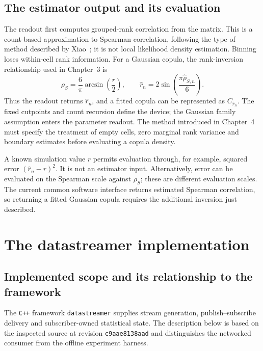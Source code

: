 \subsection{The estimator output and its evaluation}
The readout first computes grouped-rank correlation from the matrix. This is a count-based approximation to Spearman correlation, following the type of method described by Xiao~\cite{xiao_online_2017}; it is not local likelihood density estimation. Binning loses within-cell rank information. For a Gaussian copula, the rank-inversion relationship used in Chapter~3 is
\[
 \rho_S=\frac{6}{\pi}\arcsin\!\left(\frac r2\right),
 \qquad
 \widehat r_n=2\sin\!\left(\frac{\pi\widehat\rho_{S,n}}6\right).
\]
Thus the readout returns $\widehat r_n$, and a fitted copula can be represented as $C_{\widehat r_n}$. The fixed cutpoints and count recursion define the device; the Gaussian family assumption enters the parameter readout. The method introduced in Chapter~4 must specify the treatment of empty cells, zero marginal rank variance and boundary estimates before evaluating a copula density.

A known simulation value $r$ permits evaluation through, for example, squared error $(\widehat r_n-r)^2$. It is not an estimator input. Alternatively, error can be evaluated on the Spearman scale against $\rho_S$; these are different evaluation scales. The current common software interface returns estimated Spearman correlation, so returning a fitted Gaussian copula requires the additional inversion just described.

\section{The datastreamer implementation}
\label{sec:implementation}
\subsection{Implemented scope and its relationship to the framework}
The \texttt{C++} framework \texttt{datastreamer} supplies stream generation, publish--subscribe delivery and subscriber-owned statistical state. The description below is based on the inspected source at revision \texttt{c9aae8138aad} and distinguishes the networked consumer from the offline experiment harness.

